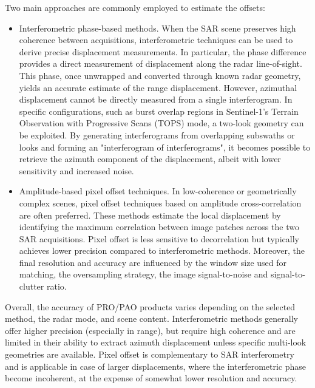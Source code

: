 Two main approaches are commonly employed to estimate the offsets:
\begin{itemize}
    \item Interferometric phase-based methods. When the SAR scene preserves high coherence between acquisitions, interferometric techniques can be used to derive precise displacement measurements. In particular, the phase difference provides a direct measurement of displacement along the radar line-of-sight. This phase, once unwrapped and converted through known radar geometry, yields an accurate estimate of the range displacement. However, azimuthal displacement cannot be directly measured from a single interferogram. In specific configurations, such as burst overlap regions in Sentinel-1's Terrain Observation with Progressive Scans (TOPS) mode, a two-look geometry can be exploited. By generating interferograms from overlapping subswaths or looks and forming an "interferogram of interferograms", it becomes possible to retrieve the azimuth component of the displacement, albeit with lower sensitivity and increased noise.
    \item Amplitude-based pixel offset techniques. In low-coherence or geometrically complex scenes, pixel offset techniques based on amplitude cross-correlation are often preferred. These methods estimate the local displacement by identifying the maximum correlation between image patches across the two SAR acquisitions. Pixel offset is less sensitive to decorrelation but typically achieves lower precision compared to interferometric methods. Moreover, the final resolution and accuracy are influenced by the window size used for matching, the oversampling strategy, the image signal-to-noise and signal-to-clutter ratio.
\end{itemize}
Overall, the accuracy of PRO/PAO products varies depending on the selected method, the radar mode, and scene content. Interferometric methods generally offer higher precision (especially in range), but require high coherence and are limited in their ability to extract azimuth displacement unless specific multi-look geometries are available. Pixel offset is complementary to SAR interferometry and is applicable in case of larger displacements, where the interferometric phase become incoherent, at the expense of somewhat lower resolution and accuracy.

